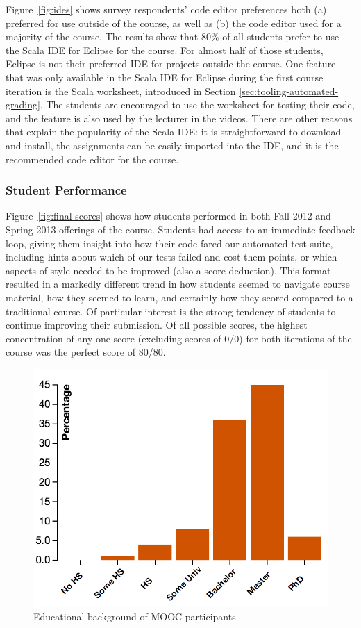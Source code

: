 \documentclass{sig-alternate}
\begin{document}
Figure~\ref{fig:ides} shows survey respondents' code editor preferences both
(a) preferred for use outside of the course, as well as (b) the code editor used
for a majority of the course. The results show that
80\% of all students prefer to use the Scala IDE for Eclipse for the course.
For almost half of those students, Eclipse is not their preferred IDE for projects outside
the course. One feature that was only available in the Scala IDE for Eclipse
during the first course iteration is the Scala worksheet, introduced in Section
\ref{sec:tooling-automated-grading}. The students are encouraged to use the
worksheet for testing their code, and the feature is also used by the lecturer
in the videos. There are other reasons that explain the popularity of the
Scala IDE: it is straightforward to download and install, the assignments can
be easily imported into the IDE, and it is the recommended code editor for the
course.

\subsubsection{Student Performance}

Figure~\ref{fig:final-scores} shows how students performed in both Fall 2012 and Spring 2013 offerings of the course.
Students had access to an immediate feedback loop, giving them insight into how their code fared our automated test suite, including hints about which of our tests failed and cost them points, or which aspects of style needed to be improved (also a score deduction). This format resulted in a markedly different trend in how students seemed to navigate course material, how they seemed to learn, and certainly how they scored compared to a traditional course. Of particular interest is the strong tendency of students to continue improving their submission. Of all possible scores, the highest concentration of any one score (excluding scores of 0/0) for both iterations of the course was the perfect score of 80/80.

\begin{figure}[ht!]
  \centering
  \includegraphics[width=0.85\columnwidth]{plots/education.png}
  \vspace{-0.5cm}
  \caption{Educational background of MOOC participants}
  \label{fig:education}
\end{figure}
\end{document}
